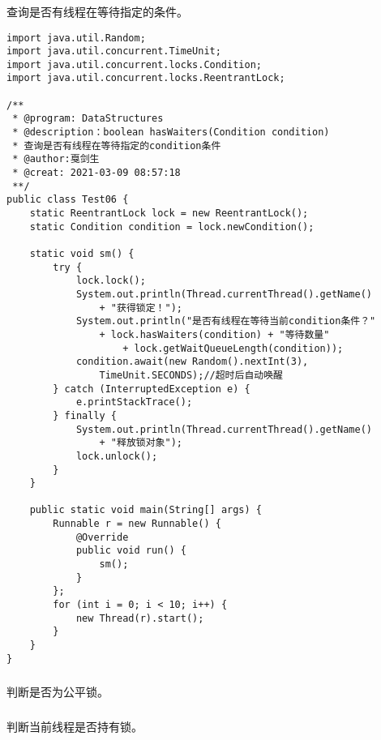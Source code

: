 \documentclass[a4paper]{report}
\begin{document}
\subsubsection{}
查询是否有线程在等待指定的条件。

\begin{Verbatim}[frame=single,numbersep=5pt,xleftmargin=1.5em,xrightmargin=1.5em]
import java.util.Random;
import java.util.concurrent.TimeUnit;
import java.util.concurrent.locks.Condition;
import java.util.concurrent.locks.ReentrantLock;

/**
 * @program: DataStructures
 * @description：boolean hasWaiters(Condition condition)
 * 查询是否有线程在等待指定的condition条件
 * @author:戛剑生
 * @creat: 2021-03-09 08:57:18
 **/
public class Test06 {
    static ReentrantLock lock = new ReentrantLock();
    static Condition condition = lock.newCondition();

    static void sm() {
        try {
            lock.lock();
            System.out.println(Thread.currentThread().getName()
                + "获得锁定！");
            System.out.println("是否有线程在等待当前condition条件？"
                + lock.hasWaiters(condition) + "等待数量"
                    + lock.getWaitQueueLength(condition));
            condition.await(new Random().nextInt(3),
                TimeUnit.SECONDS);//超时后自动唤醒
        } catch (InterruptedException e) {
            e.printStackTrace();
        } finally {
            System.out.println(Thread.currentThread().getName()
                + "释放锁对象");
            lock.unlock();
        }
    }

    public static void main(String[] args) {
        Runnable r = new Runnable() {
            @Override
            public void run() {
                sm();
            }
        };
        for (int i = 0; i < 10; i++) {
            new Thread(r).start();
        }
    }
}\end{Verbatim}
\subsubsection{}
判断是否为公平锁。

\subsubsection{}
判断当前线程是否持有锁。
\end{document}
